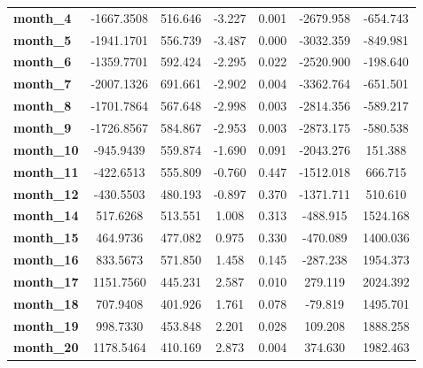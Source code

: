 \begin{center}
\begin{tabular}{lcccccc}
\textbf{month\_4}     &   -1667.3508  &      516.646     &    -3.227  &         0.001        &    -2679.958    &     -654.743     \\
\textbf{month\_5}     &   -1941.1701  &      556.739     &    -3.487  &         0.000        &    -3032.359    &     -849.981     \\
\textbf{month\_6}     &   -1359.7701  &      592.424     &    -2.295  &         0.022        &    -2520.900    &     -198.640     \\
\textbf{month\_7}     &   -2007.1326  &      691.661     &    -2.902  &         0.004        &    -3362.764    &     -651.501     \\
\textbf{month\_8}     &   -1701.7864  &      567.648     &    -2.998  &         0.003        &    -2814.356    &     -589.217     \\
\textbf{month\_9}     &   -1726.8567  &      584.867     &    -2.953  &         0.003        &    -2873.175    &     -580.538     \\
\textbf{month\_10}    &    -945.9439  &      559.874     &    -1.690  &         0.091        &    -2043.276    &      151.388     \\
\textbf{month\_11}    &    -422.6513  &      555.809     &    -0.760  &         0.447        &    -1512.018    &      666.715     \\
\textbf{month\_12}    &    -430.5503  &      480.193     &    -0.897  &         0.370        &    -1371.711    &      510.610     \\
\textbf{month\_14}    &     517.6268  &      513.551     &     1.008  &         0.313        &     -488.915    &     1524.168     \\
\textbf{month\_15}    &     464.9736  &      477.082     &     0.975  &         0.330        &     -470.089    &     1400.036     \\
\textbf{month\_16}    &     833.5673  &      571.850     &     1.458  &         0.145        &     -287.238    &     1954.373     \\
\textbf{month\_17}    &    1151.7560  &      445.231     &     2.587  &         0.010        &      279.119    &     2024.392     \\
\textbf{month\_18}    &     707.9408  &      401.926     &     1.761  &         0.078        &      -79.819    &     1495.701     \\
\textbf{month\_19}    &     998.7330  &      453.848     &     2.201  &         0.028        &      109.208    &     1888.258     \\
\textbf{month\_20}    &    1178.5464  &      410.169     &     2.873  &         0.004        &      374.630    &     1982.463     \\

\end{tabular}
\end{center}
